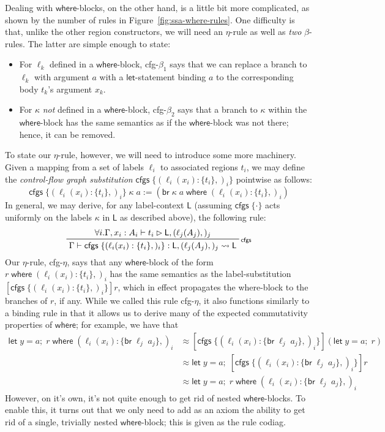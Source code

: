 \documentclass[acmsmall,screen,review]{acmart}
\newcommand{\ms}[1]{\ensuremath{\mathsf{#1}}}
\newcommand{\lto}{:}
\newcommand{\letexpr}[3]{\ensuremath{\ms{let}\;#1 = #2;\;#3}}
\newcommand{\brb}[2]{\ms{br}\;#1\;#2}
\newcommand{\where}[2]{#1\;\ms{where}\;#2}
\newcommand{\wbranch}[3]{#1(#2) \lto \{#3\}}
\newcommand{\cfgsubst}[1]{\ms{cfgs}\;\{#1\}}
\newcommand{\bhyp}[2]{#1 : #2}
\newcommand{\lhyp}[2]{#1(#2)}
\newcommand{\rle}[1]{{\scriptsize\textsf{#1}}}
\newcommand{\haslb}[3]{#1 \vdash #2 \rhd #3}
\newcommand{\lbsubst}[4]{#1 \vdash #2: #3 \rightsquigarrow #4}
\newcommand{\teqv}{\approx}
\newcommand{\brle}[1]{{\scriptsize\textsf{#1}}}
\begin{document}
Dealing with \ms{where}-blocks, on the other hand, is a little bit more complicated, as shown by the
number of rules in Figure~\ref{fig:ssa-where-rules}. One difficulty is that, unlike the other region
constructors, we will need an $\eta$-rule as well as \emph{two} $\beta$-rules. The latter are simple
enough to state:
\begin{itemize}
  \item For $\ell_k$ defined in a \ms{where}-block, \brle{cfg-$\beta_1$} says that we can replace a
  branch to $\ell_k$ with argument $a$ with a \ms{let}-statement binding $a$ to the corresponding
  body $t_k$'s argument $x_k$.
  \item For $\kappa$ \emph{not} defined in a \ms{where}-block, \brle{cfg-$\beta_2$} says that
  a branch to $\kappa$ within the \ms{where}-block has the same semantics as if the \ms{where}-block
  was not there; hence, it can be removed.
\end{itemize}
To state our $\eta$-rule, however, we will need to introduce some more machinery. Given a mapping
from a set of labels $\ell_i$ to associated regions $t_i$, we may define the \emph{control-flow
graph substitution} $\cfgsubst{(\wbranch{\ell_i}{x_i}{t_i},)_i}$ pointwise as follows:
\begin{equation}
  \cfgsubst{(\wbranch{\ell_i}{x_i}{t_i},)_i}\;\kappa\;a
  := (\where{\brb{\kappa}{a}}{(\wbranch{\ell_i}{x_i}{t_i},)_i})
\end{equation}
In general, we may derive, for any label-context $\ms{L}$ (assuming $\cfgsubst{\cdot}$ acts uniformly
on the labels $\kappa$ in $\ms{L}$ as described above), the following rule:
\begin{equation}
  \prftree[r]{\rle{cfgs}}
    {\forall i. \haslb{\Gamma, \bhyp{x_i}{A_i}}{t_i}{\ms{L}, (\lhyp{\ell_j}{A_j},)_j}}
    {\lbsubst{\Gamma}
      {\cfgsubst{(\wbranch{\ell_i}{x_i}{t_i},)_i}}{\ms{L}, (\lhyp{\ell_j}{A_j},)_j}{\ms{L}}}
\end{equation}
Our $\eta$-rule, \brle{cfg-$\eta$}, says that any \ms{where}-block of the form
$\where{r}{(\wbranch{\ell_i}{x_i}{t_i},)_i}$ has the same semantics as the label-substitution
$[\cfgsubst{(\wbranch{\ell_i}{x_i}{t_i},)_i}]r$, which in effect propagates the where-block to the
branches of $r$, if any. While we called this rule \brle{cfg-$\eta$}, it also functions similarly
to a binding rule in that it allows us to derive many of the expected commutativity properties of
\ms{where}; for example, we have that
\begin{align*}
  \where{\letexpr{y}{a}{r}}{(\wbranch{\ell_i}{x_i}{\brb{\ell_j}{a_j}},)_i}
  &\teqv [\cfgsubst{(\wbranch{\ell_i}{x_i}{\brb{\ell_j}{a_j}},)_i}](\letexpr{y}{a}{r}) \\
  &\teqv \letexpr{y}{a}{[\cfgsubst{(\wbranch{\ell_i}{x_i}{\brb{\ell_j}{a_j}},)_i}]r} \\
  &\teqv \letexpr{y}{a}{\where{r}{(\wbranch{\ell_i}{x_i}{\brb{\ell_j}{a_j}},)_i}}
\end{align*}
However, on it's own, it's not quite enough to get rid of nested \ms{where}-blocks. To enable this,
it turns out that we only need to add as an axiom the ability to get rid of a single, trivially
nested \ms{where}-block; this is given as the rule \brle{codiag}.
\end{document}
